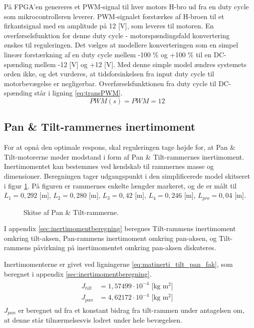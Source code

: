 På FPGA'en genereres et PWM-signal til hver motors H-bro ud fra en
duty cycle som mikrocontrolleren leverer.
PWM-signalet forstærkes af H-broen til et firkantsignal med en amplitude på 12 [V],
som leveres til motoren.
En overførselsfunktion for denne duty cycle - motorspændingsfald konvertering ønskes
til reguleringen.
Det vælges at modellere konverteringen som en simpel lineær forstærkning af en duty cycle mellem -100 \% og +100 \%
til en DC-spænding mellem -12 [V] og +12 [V]. Med denne simple model ændres systemets orden ikke,
og det vurderes, at tidsforsinkelsen fra input duty cycle til motorbevægelse er negligerbar.
Overførselsfunktionen fra duty cycle til DC-spænding står i ligning \ref{eq:transPWM}.
\begin{equation}
	PWM\left(s\right)=PWM=12
	\label{eq:transPWM}
\end{equation}

\subsection{Pan \& Tilt-rammernes inertimoment}
\label{sec:inertimoment}
For at opnå den optimale respons, skal reguleringen tage højde for, at Pan \& Tilt-motorerne møder modstand i form af
Pan \& Tilt-rammernes inertimoment. Inertimomentet kan bestemmes ved kendskab til rammernes
masse og dimensioner. Beregningen tager udgangspunkt i den simplificerede model skitseret i figur \ref{fig:inerti_PTS}.
På figuren er rammernes enkelte længder markeret, og de er målt til \({L_{1}} =0,292\) [m],
\({L_{2}} =0,280\) [m], \({L_{3}}= 0,42\) [m], \({L_{4}} =0,246\) [m], \({L_{pro}}=0,04\) [m].
\begin{figure}[!th]
\centering
\begin{tikzpicture}[scale=0.8]

\end{tikzpicture}
\caption[Skitse af Pan \& Tilt-rammerne]{Skitse af Pan \& Tilt-rammerne.}
\label{fig:inerti_PTS}
\end{figure}

I appendix \ref{sec:inertimomentberegning} beregnes Tilt-rammens inertimoment omkring tilt-aksen,
Pan-rammens inertimoment omkring pan-aksen,
og Tilt-rammens påvirkning på inertimomentet omkring pan-aksen diskuteres.

Inertimomenterne er givet ved ligningerne \ref{eq:matinerti_tilt_pan_fak},
som beregnet i appendix \ref{sec:inertimomentberegning}.
\begin{align}
\label{eq:matinerti_tilt_pan_fak}
\begin{split}
{J_{tilt}}&=1,57499\cdot{10}^{-4} \text{ [kg m$^2$]}
\\
{J_{pan}}&=4,62172\cdot{10}^{-4} \text{ [kg m$^2$]}
\end{split}
\end{align}
\(J_{pan}\) er beregnet ud fra et konstant bidrag fra tilt-rammen under antagelsen om,
at denne står tilnærmelsesvis lodret under hele bevægelsen.

